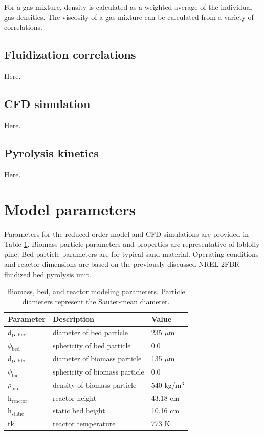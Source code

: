 \documentclass{article}
\begin{document}
For a gas mixture, density is calculated as a weighted average of the individual gas densities. The viscosity of a gas mixture can be calculated from a variety of correlations.

\subsection{Fluidization correlations}

Here.

\subsection{CFD simulation}

Here.

\subsection{Pyrolysis kinetics}

Here.

\section{Model parameters}

Parameters for the reduced-order model and CFD simulations are provided in Table \ref{tab:params}. Biomass particle parameters and properties are representative of loblolly pine. Bed particle parameters are for typical sand material. Operating conditions and reactor dimensions are based on the previously discussed NREL 2FBR fluidized bed pyrolysis unit.

\begin{table}[ht]
    \centering
    \caption{Biomass, bed, and reactor modeling parameters. Particle diameters represent the Sauter-mean diameter.}
    \begin{tabular}{lll}
        \hline
        Parameter & Description & Value \\
        \hline
        d$_\textrm{p,\,bed}$    & diameter of bed particle          & 235 $\mu$m \\
        $\phi_\textrm{bed}$     & sphericity of bed particle        & 0.0 \\
        d$_\textrm{p,\,bio}$    & diameter of biomass particle      & 135 $\mu$m \\
        $\phi_\textrm{bio}$     & sphericity of biomass particle    & 0.0 \\
        $\rho_\textrm{bio}$     & density of biomass particle       & 540 kg/m$^3$ \\
        h$_\textrm{reactor}$    & reactor height                    & 43.18 cm \\
        h$_\textrm{static}$     & static bed height                 & 10.16 cm\\
        tk                      & reactor temperature               & 773 K \\
        \hline
    \end{tabular}
    \label{tab:params}
\end{table}
\end{document}
